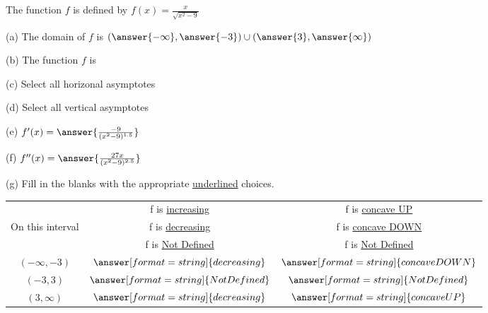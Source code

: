 \documentclass{ximera}
\begin{document}
\begin{exercise}
The function $f$ is defined by $f(x)=\frac{x}{\sqrt{x^2-9}}$

(a) The domain of $f$ is $(\answer{-\infty},\answer{-3})\cup (\answer{3},\answer{\infty})$

(b) The function $f$ is \begin{multipleChoice}
\end{multipleChoice}

(c) Select all horizonal asymptotes
\begin{selectAll}
\end{selectAll}

(d) Select all vertical asymptotes
\begin{selectAll}
\end{selectAll}  

(e) $f'(x)=\answer{\frac{-9}{(x^2-9)^{1.5}}}$

(f) $f''(x)=\answer{\frac{27x}{(x^2-9)^{2.5}}}$

(g) Fill in the blanks with the appropriate \underline{underlined} choices.

\begin{tabular}{|c|c|c|}\hline
 & f is \underline{increasing} & f is \underline{concave UP} \\
On this interval & f is \underline{decreasing} & f is \underline{concave DOWN} \\
 & f is \underline{Not Defined} & f is \underline{Not Defined} \\ \hline
$(-\infty,-3)$ & $\answer[format=string]{decreasing}$& $\answer[format=string]{concave DOWN}$\\ \hline
$(-3,3)$ & $\answer[format=string]{Not Defined}$& $\answer[format=string]{Not Defined}$\\ \hline
$(3,\infty)$ & $\answer[format=string]{decreasing}$& $\answer[format=string]{concave UP}$\\\hline 
\end{tabular}


\end{exercise}
\end{document}
